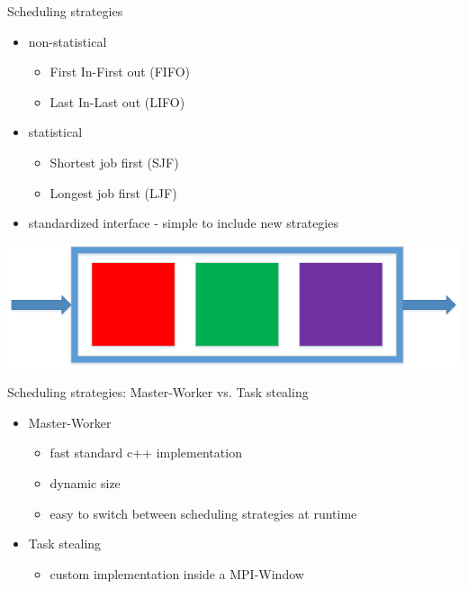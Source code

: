 	\begin{frame}{Scheduling strategies}
	\begin{minipage}[]{.7\textwidth}%
			\begin{itemize}
		\item<2-> non-statistical
		\begin{itemize}
			\item First In-First out (FIFO)
			\item Last In-Last out (LIFO)
		\end{itemize}
		\item<3-> statistical
		\begin{itemize}
			\item Shortest job first (SJF)
			\item Longest job first (LJF)
		\end{itemize}
		\item<4-> standardized interface - simple to include new strategies
		\end{itemize}
\end{minipage}%
\begin{minipage}[]{.3\textwidth}%
  \includegraphics[width=\textwidth]{images/fifo}%
\end{minipage}		
		
	\end{frame}
	\begin{frame}{Scheduling strategies: Master-Worker vs. Task stealing}
		\begin{itemize}
			\item<2-> Master-Worker
				\begin{itemize}
					\item fast standard c++ implementation
					\item dynamic size
					\item easy to switch between scheduling strategies at runtime	
				\end{itemize}
			
			\item<3-> Task stealing
					\begin{itemize}
						\item custom implementation inside a MPI-Window
					\end{itemize}
			
		\end{itemize}
	\end{frame}